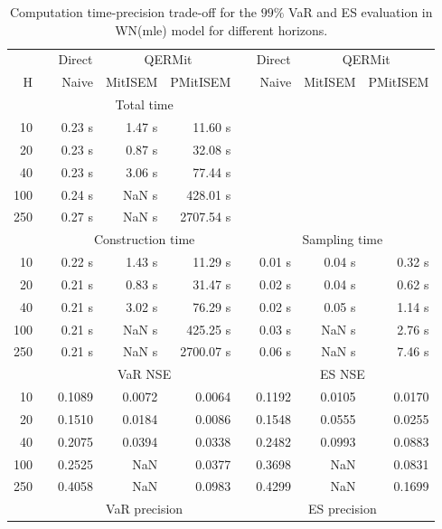 \footnotesize{  
{ \renewcommand{\arraystretch}{1.3} 
\begin{longtable}{rr rrr r rrr}  
\caption{Computation time-precision trade-off for the  $99\%$ VaR and ES evaluation in WN(mle) model for different horizons.} 
\label{tab:time_precision_WN_ML} \\ 
 & & \multicolumn{1}{c}{Direct} & \multicolumn{2}{c}{QERMit}&  & \multicolumn{1}{c}{Direct} & \multicolumn{2}{c}{QERMit} \\ \cline{3-5} \cline{7-9} 
 H & & Naive & MitISEM & PMitISEM & & Naive & MitISEM & PMitISEM \\ \hline 
 & & \multicolumn{3}{c}{Total time}  \\ \cline{3-5} 
10 & & 0.23 s & 1.47 s & 11.60 s  \\ 
20 & & 0.23 s & 0.87 s & 32.08 s  \\ 
40 & & 0.23 s & 3.06 s & 77.44 s  \\ 
100 & & 0.24 s &  NaN s & 428.01 s  \\ 
250 & & 0.27 s &  NaN s & 2707.54 s  \\ 
\hline 
 & & \multicolumn{3}{c}{Construction time} & & \multicolumn{3}{c}{ Sampling time} \\ \cline{3-5}  \cline{7-9}
10 & & 0.22 s & 1.43 s & 11.29 s &&  0.01 s & 0.04 s & 0.32 s \\ 
20 & & 0.21 s & 0.83 s & 31.47 s &&  0.02 s & 0.04 s & 0.62 s \\ 
40 & & 0.21 s & 3.02 s & 76.29 s &&  0.02 s & 0.05 s & 1.14 s \\ 
100 & & 0.21 s &  NaN s & 425.25 s &&  0.03 s &  NaN s & 2.76 s \\ 
250 & & 0.21 s &  NaN s & 2700.07 s &&  0.06 s &  NaN s & 7.46 s \\ 
\hline 
 & & \multicolumn{3}{c}{VaR NSE} &&  \multicolumn{3}{c}{ES NSE} \\ \cline{3-5}  \cline{7-9}
10 && 0.1089  & 0.0072  & 0.0064 && 0.1192  & 0.0105  & 0.0170  \\ 
20 && 0.1510  & 0.0184  & 0.0086 && 0.1548  & 0.0555  & 0.0255  \\ 
40 && 0.2075  & 0.0394  & 0.0338 && 0.2482  & 0.0993  & 0.0883  \\ 
100 && 0.2525  &    NaN  & 0.0377 && 0.3698  &    NaN  & 0.0831  \\ 
250 && 0.4058  &    NaN  & 0.0983 && 0.4299  &    NaN  & 0.1699  \\ 
\hline 
 & & \multicolumn{3}{c}{VaR precision} &&  \multicolumn{3}{c}{ES precision} \\ \cline{3-5}  \cline{7-9}

\end{longtable}}}
